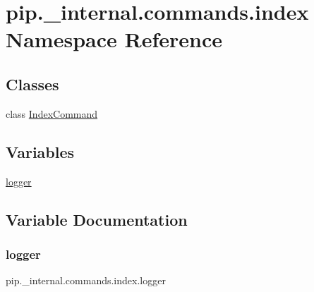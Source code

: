 \hypertarget{namespacepip_1_1__internal_1_1commands_1_1index}{}\section{pip.\+\_\+internal.\+commands.\+index Namespace Reference}
\label{namespacepip_1_1__internal_1_1commands_1_1index}
\subsection*{Classes}
\begin{DoxyCompactItemize}
\item 
class \hyperlink{classpip_1_1__internal_1_1commands_1_1index_1_1IndexCommand}{Index\+Command}
\end{DoxyCompactItemize}
\subsection*{Variables}
\begin{DoxyCompactItemize}
\item 
\hyperlink{namespacepip_1_1__internal_1_1commands_1_1index_aa1deec22d20d6e687f13de0c0943cc87}{logger}
\end{DoxyCompactItemize}


\subsection{Variable Documentation}
\mbox{\label{namespacepip_1_1__internal_1_1commands_1_1index_aa1deec22d20d6e687f13de0c0943cc87}} 
\subsubsection{\texorpdfstring{logger}{logger}}
{\footnotesize\ttfamily pip.\+\_\+internal.\+commands.\+index.\+logger}


